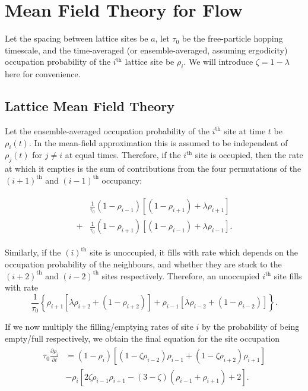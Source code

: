 \documentclass[
reprint, amsmath,amssymb,
]{revtex4-1}
\newcommand{\partDeriv}[2]{\frac{\partial #1}{\partial #2}}
\begin{document}
\section{Mean Field Theory for Flow} \label{sec:mftPred}
  
Let the spacing between lattice
sites be $a$, let $\tau_0$ be the free-particle hopping timescale, and
the time-averaged (or ensemble-averaged, assuming ergodicity)
occupation probability of the $i^{\mathrm{th}}$ lattice site be
$\rho_i$.  We will introduce $\zeta = 1 - \lambda $ here for convenience.

\subsection{Lattice Mean Field Theory} Let the ensemble-averaged occupation
probability of the $i^\mathrm{th}$ site at time $t$ be $\rho_i
(t)$. In the mean-field approximation this is assumed to be
independent of $\rho_j(t)$ for $j \neq i $ at equal times. Therefore,
if the $i^\mathrm{th}$ site is occupied, then the rate at which it empties
is the sum of contributions from the
four permutations of the $(i+1)^\mathrm{th}$ and
$(i-1)^\mathrm{th}$ occupancy: 

\begin{align}
\begin{split}
 &\frac{1}{\tau_0 } (1-\rho_{i-1})\left[ (1 - \rho_{i+1}) + \lambda \rho_{i+1} \right] \\
 +&\frac{1}{\tau_0 } (1-\rho_{i+1})\left[ (1 - \rho_{i-1}) + \lambda \rho_{i-1} \right] .
\end{split}
 \end{align}

Similarly, if the $(i)^\mathrm{th}$ site is unoccupied, it fills with
rate which depends on the occupation probability of the neighbours,
and whether they are stuck to the $(i+2)^\mathrm{th}$ and $(i-2)^\mathrm{th}$ sites
respectively. Therefore, an unoccupied $i^\mathrm{th}$ site fills with rate
\begin{equation}
\frac{1}{\tau_0 } \left\{ \rho_{i+1} \left[ \lambda \rho_{i+2} + (1-\rho_{i+2}) \right] + \rho_{i-1} \left[ \lambda \rho_{i-2} + (1-\rho_{i-2}) \right] \right\}.
\end{equation}

If we now multiply the filling/emptying rates of site $i$ by the
probability of being empty/full respectively, we obtain the
final equation for the site occupation 
\begin{align}
\label{eq:latticeMFT}
\begin{split}
 \tau_0 \partDeriv{\rho_i}{t} &= \left( 1-\rho_i \right) \left[ \left(1-\zeta\rho_{i-2} \right) \rho_{i-1} + \left(1-\zeta\rho_{i+2} \right) \rho_{i+1} \right] \\
 &- \rho_i \left[ 2 \zeta \rho_{i-1} \rho_{i+1}  - (3-\zeta)\left(\rho_{i-1} + \rho_{i+1}\right) + 2 \right].
 \end{split}
 \end{align}
\end{document}
